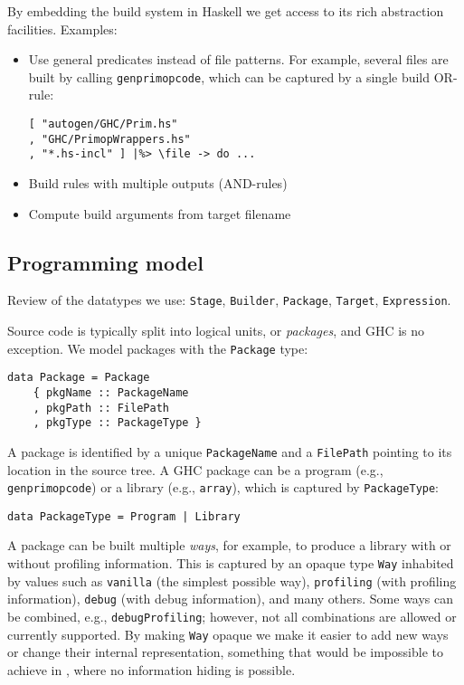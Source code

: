
By embedding the build system in Haskell we get access to its rich abstraction
facilities. Examples:
\begin{itemize}
  \item Use general predicates instead of file patterns. For example, several
  files are built by calling \texttt{genprimopcode}, which can be captured by a
  single build OR-rule:
  
\begin{lstlisting}[basicstyle=\ttfamily]
[ "autogen/GHC/Prim.hs"
, "GHC/PrimopWrappers.hs"
, "*.hs-incl" ] |%> \file -> do ...
\end{lstlisting}
  
  \item Build rules with multiple outputs (AND-rules)
  \item Compute build arguments from target filename
\end{itemize}

\subsection{Programming model}

Review of the datatypes we use: \texttt{Stage}, \texttt{Builder}, 
\texttt{Package}, \texttt{Target}, \texttt{Expression}.


Source code is typically split into logical units, or \emph{packages},
and GHC is no exception. We model packages with the \texttt{Package}
type:

\begin{lstlisting}[basicstyle=\ttfamily]
data Package = Package
    { pkgName :: PackageName
    , pkgPath :: FilePath
    , pkgType :: PackageType }
\end{lstlisting}

A package is identified by a unique \texttt{PackageName} and a
\texttt{FilePath} pointing to its location in the source tree. A GHC package can
be a program (e.g., \texttt{genprimopcode}) or a library (e.g., \texttt{array}), which is
captured by \texttt{PackageType}:

\begin{lstlisting}[basicstyle=\ttfamily]
data PackageType = Program | Library
\end{lstlisting}

A package can be built multiple \emph{ways}, for example, to produce a library
with or without profiling information. This is captured by an opaque
type \texttt{Way} inhabited by values such as \texttt{vanilla} (the simplest
possible way), \texttt{profiling} (with profiling information), \texttt{debug} (with
debug information), and many others. Some ways can be combined, e.g.,
\texttt{debugProfiling}; however, not all combinations are allowed or currently
supported. By making \texttt{Way} opaque we make it easier to add new ways
or change their internal representation, something that would be
impossible to achieve in \make{}, where no information hiding is
possible.
 
